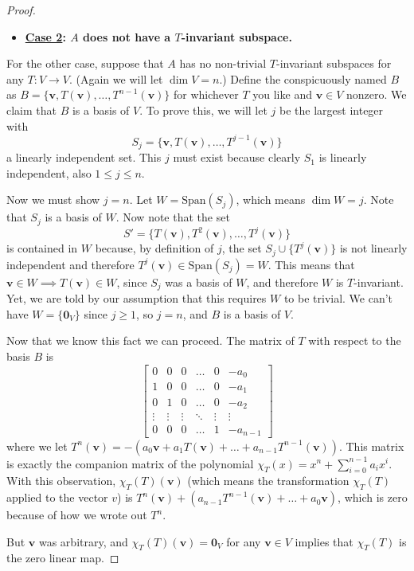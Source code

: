 \documentclass{report}
\newcommand{\set}[1]{\{ #1 \}}
\newcommand{\Span}[1]{\mathrm{Span}\left( #1 \right)}
\renewcommand{\vec}[1]{\mathbf{#1}}
\begin{document}
\begin{proof}
            \begin{itemize}
                \item \textbf{\ul{Case 2}: $A$ does not have a $T$-invariant subspace.}
            \end{itemize}
            For the other case, suppose that $A$ has no non-trivial $T$-invariant subspaces for any $T: V \rightarrow V$.
            (Again we will let $\dim{V} = n$.)
            Define the conspicuously named $B$ as $B = \set{\vec{v}, T(\vec{v}), \dots, T^{n-1}(\vec{v})}$ for whichever $T$ you
            like and $\vec{v} \in V$ nonzero. We claim that $B$ is a basis of $V$.
            To prove this, we will let $j$ be the largest integer with 
            \[ S_j = \set{\vec{v}, T(\vec{v}), \dots, T^{j-1}(\vec{v})}\]
            a linearly independent set. This $j$ must exist because clearly $S_1$ is linearly independent, also $1 \leq j \leq n$.
            
            Now we must show $j = n$. Let $W = \Span{S_j}$, which means $\dim{W} = j$. Note that $S_j$ is a basis of $W$. Now
            note that the set
            \[S' = \set{T(\vec{v}), T^2(\vec{v}), \dots, T^j (\vec{v})}\]
            is contained in $W$ because, by definition of $j$, the set $S_j \cup \set{T^j (\vec{v})}$ is not linearly independent
            and therefore $T^j (\vec{v}) \in \Span{S_j} = W$. This means that $\vec{v} \in W \implies T(\vec{v}) \in W$, since $S_j$
            was a basis of $W$, and therefore $W$ is $T$-invariant. Yet, we are told by our assumption that this requires $W$ to be
            trivial. We can't have $W = \set{\vec{0}_V}$ since $j \geq 1$, so $j = n$, and $B$ is a basis of $V$.

            Now that we know this fact we can proceed. The matrix of $T$ with respect to the basis $B$ is
            \[ \begin{bmatrix} 0 & 0 & 0 & \dots & 0 & -a_0 \\ 1 & 0 & 0 & \dots & 0 & -a_1 \\ 0 & 1 & 0 & \dots & 0 & -a_2 \\
            \vdots & \vdots & \vdots & \ddots & \vdots & \vdots \\ 0 & 0 & 0 & \dots & 1 & - a_{n-1}\end{bmatrix}\]
            where we let $T^n (\vec{v}) = - \left( a_0 \vec{v}+ a_1 T(\vec{v}) + \dots + a_{n-1} T^{n-1} (\vec{v}) \right)$. This matrix
            is exactly the companion matrix of the polynomial $\chi_T (x) = x^n + \sum_{i=0}^{n-1} a_i x^i$. With this
            observation, $\chi_T (T) (\vec{v})$ (which means the transformation $\chi_T (T)$ applied to the vector $v$)
            is $T^n (\vec{v}) + \left( a_{n-1} T^{n-1} (\vec{v}) + \dots + a_0 \vec{v} \right)$, which is zero because
            of how we wrote out $T^n$. 

            But $\vec{v}$ was arbitrary, and $\chi_T (T) (\vec{v}) = \vec{0}_V$ for any $\vec{v} \in V$ implies that
            $\chi_T (T)$ is the zero linear map.
        \end{proof}
\end{document}
